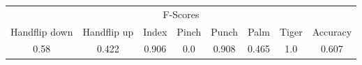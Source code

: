 \documentclass{standalone}
\begin{document}
 
 \begin{tabular}{|c|c|c|c|c|c|c ||c|}
\cline{1-8}\multicolumn{8}{|c|}{F-Scores} \\ 
\cline{1-8}Handflip down & Handflip up & Index & Pinch & Punch & Palm & Tiger & Accuracy\\ 
\cline{1-8}0.58 & 0.422 & 0.906 & 0.0 & 0.908 & 0.465 & 1.0 & 0.607\\ 
 \cline{1-8}\hline \end{tabular}
 
\end{document}
